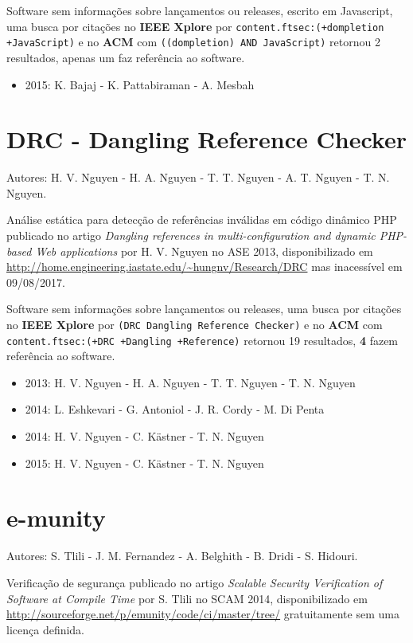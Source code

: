 Software sem informações sobre lançamentos ou releases,
escrito em Javascript,
uma busca por citações no {\bf IEEE Xplore} por
\texttt{content.ftsec:(+dompletion +JavaScript)}
e no {\bf ACM} com
\texttt{((dompletion) AND JavaScript)}
retornou
2 resultados,
apenas um faz referência ao software.

\begin{itemize}
\item 2015: K. Bajaj - K. Pattabiraman - A. Mesbah
\end{itemize}

\section{DRC - Dangling Reference Checker}

Autores:
H. V. Nguyen - H. A. Nguyen - T. T. Nguyen - A. T. Nguyen - T. N. Nguyen.

Análise estática para detecção de referências inválidas em código dinâmico PHP
publicado no artigo {\it Dangling references in multi-configuration and dynamic PHP-based Web applications}
por H. V. Nguyen
no ASE 2013,
disponibilizado em \url{http://home.engineering.iastate.edu/~hungnv/Research/DRC}
mas inacessível em 09/08/2017.

Software sem informações sobre lançamentos ou releases,
uma busca por citações no {\bf IEEE Xplore} por
\texttt{(DRC Dangling Reference Checker)}
e no {\bf ACM} com
\texttt{content.ftsec:(+DRC +Dangling +Reference)}
retornou
19 resultados,
{\bf 4} fazem referência ao software.

\begin{itemize}
\item 2013: H. V. Nguyen - H. A. Nguyen - T. T. Nguyen - T. N. Nguyen
\item 2014: L. Eshkevari - G. Antoniol - J. R. Cordy - M. Di Penta
\item 2014: H. V. Nguyen - C. K\"{a}stner - T. N. Nguyen
\item 2015: H. V. Nguyen - C. K\"{a}stner - T. N. Nguyen
\end{itemize}

\section{e-munity}

Autores:
S. Tlili - J. M. Fernandez - A. Belghith - B. Dridi - S. Hidouri.

Verificação de segurança
publicado no artigo {\it Scalable Security Verification of Software at Compile Time}
por S. Tlili
no SCAM 2014,
disponibilizado em \url{http://sourceforge.net/p/emunity/code/ci/master/tree/}
gratuitamente
sem uma licença definida.

